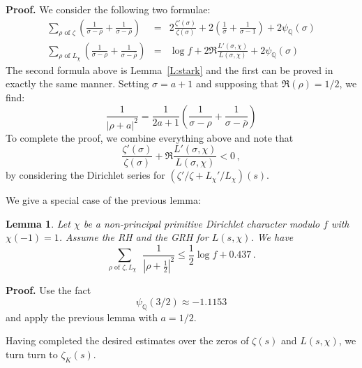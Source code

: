 \documentclass{amsart}
\newtheorem{lemma}[theorem]{Lemma}
\numberwithin{equation}{section}
\numberwithin{table}{section}
\begin{document}
\noindent\textbf{Proof.}
We consider the following two formulae:
\begin{eqnarray*}
\sum_{\rho\text{ of } \zeta}
\left(
\frac{1}{\sigma-\rho}
+
\frac{1}{\sigma-\overline{\rho}}
\right)
&=&
2\frac{\zeta'(\sigma)}{\zeta(\sigma)}
+
2\left(\frac{1}{\sigma}+\frac{1}{\sigma-1}\right)
+
2\psi_{\mathbb{Q}}(\sigma)
\\[1ex]
\sum_{\rho\text{ of } L_\chi}
\left(
\frac{1}{\sigma-\rho}
+
\frac{1}{\sigma-\overline{\rho}}
\right)
&=&
\log f
+
2
\Re
\frac{L'(\sigma,\chi)}{L(\sigma,\chi)}
+
2\psi_{\mathbb{Q}}(\sigma)
\end{eqnarray*}
The second formula above
is Lemma~\ref{L:stark} and the first can be proved in exactly the same manner.
Setting $\sigma=a+1$ and supposing that
$\Re(\rho)=1/2$, we find:
\begin{equation}\label{E:GRH.alg}
  \frac{1}{|\rho+a|^2}
  =
  \frac{1}{2a+1}
  \left(
  \frac{1}{\sigma-\rho}+\frac{1}{\sigma-\overline{\rho}}
  \right)
\end{equation}
To complete the proof, we combine everything above and note that
$$
  \frac{\zeta'(\sigma)}{\zeta(\sigma)}
  +
  \Re
  \frac{L'(\sigma,\chi)}{L(\sigma,\chi)}
  <
  0
  \,,
$$
by considering the Dirichlet series for $(\zeta'/\zeta+L_\chi'/L_\chi)(s)$.
{\raisebox{-.25ex}{\scalebox{.786}[1.272]{$\blacksquare$}}}

\vspace{1ex}

We give a special case of the previous lemma:
\begin{lemma}\label{L:q2zerosbound}
Let $\chi$ be a non-principal primitive Dirichlet character modulo $f$ with $\chi(-1)=1$.
Assume the RH and the GRH for $L(s,\chi)$.  We have
$$
  \sum_{\rho\text{ of $\zeta,L_\chi$ }}
  \frac{1}{\left|\rho+\frac{1}{2}\right|^2}
  \leq
  \frac{1}{2}\log f
  +0.437
  \,.
$$

\end{lemma}

\noindent\textbf{Proof.}
Use the fact
\begin{equation}\label{E:somecomp}
  
  \psi_{\mathbb{Q}}(3/2)\approx
  -1.1153
\end{equation}
and apply the previous lemma with $a=1/2$.
{\raisebox{-.25ex}{\scalebox{.786}[1.272]{$\blacksquare$}}}

\vspace{1ex}

Having completed the desired estimates over the zeros of $\zeta(s)$ and $L(s,\chi)$, we turn
turn to $\zeta_K(s)$.
\end{document}
